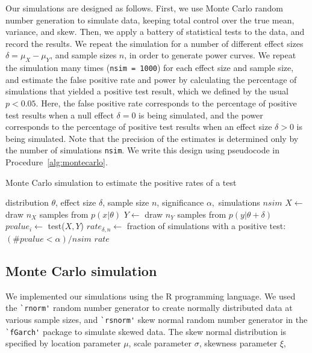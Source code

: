 \documentclass[10pt]{article} %
\begin{document}
Our simulations are designed as follows. First, we use Monte Carlo random number generation to simulate data, keeping total control over the true mean, variance, and skew. Then, we apply a battery of statistical tests to the data, and record the results. We repeat the simulation for a number of different effect sizes $\delta=\mu_X-\mu_Y$, and sample sizes $n$, in order to generate power curves. We repeat the simulation many times (\verb|nsim = 1000|) for each effect size and sample size, and estimate the false positive rate and power by calculating the percentage of simulations that yielded a positive test result, which we defined by the usual $p<0.05$. Here, the false positive rate corresponds to the percentage of positive test results when a null effect $\delta=0$ is being simulated, and the power corresponds to the percentage of positive test results when an effect size $\delta>0$ is being simulated. Note that the precision of the estimates is determined only by the number of simulations \verb|nsim|. We write this design using pseudocode in Procedure~\ref{alg:montecarlo}.


\begin{algorithm}

\caption{Monte Carlo simulation to estimate the positive rates of a test}
\label{alg:montecarlo}
\begin{algorithmic} 
\REQUIRE distribution $\theta$, effect size $\delta$, sample size $n$, significance $\alpha,$ simulations $nsim$
 \STATE $X \leftarrow$ draw $n_X$ samples from $p(x|\theta)$
 \STATE $Y \leftarrow$ draw $n_Y$ samples from $p(y|\theta+\delta)$
 \STATE $pvalue_i \leftarrow$ test($X,Y$)
 \ENDFOR
 \STATE $rate_{\delta,n} \leftarrow$ fraction of simulations with a positive test: $(\#pvalue<\alpha)/nsim$ 
\ENDFOR
\ENDFOR
\ENSURE $rate$
\end{algorithmic}
\end{algorithm}


\subsection{Monte Carlo simulation}

We implemented our simulations using the R programming language. We used the \verb|`rnorm'| random number generator to create normally distributed data at various sample sizes, and \verb|`rsnorm'| skew normal random number generator in the \verb|`fGarch'| package to simulate skewed data. The skew normal distribution is specified by location parameter $\mu$, scale parameter $\sigma$, skewness parameter $\xi$,
\end{document}
